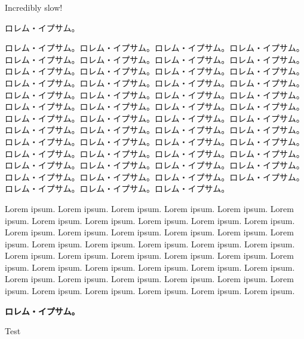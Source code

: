 \documentclass{ltjarticle}
\begin{document}
Incredibly slow!

ロレム・イプサム。

ロレム・イプサム。ロレム・イプサム。ロレム・イプサム。ロレム・イプサム。ロレム・イプサム。ロレム・イプサム。ロレム・イプサム。ロレム・イプサム。ロレム・イプサム。ロレム・イプサム。ロレム・イプサム。ロレム・イプサム。ロレム・イプサム。ロレム・イプサム。ロレム・イプサム。ロレム・イプサム。ロレム・イプサム。ロレム・イプサム。ロレム・イプサム。ロレム・イプサム。ロレム・イプサム。ロレム・イプサム。ロレム・イプサム。ロレム・イプサム。ロレム・イプサム。ロレム・イプサム。ロレム・イプサム。ロレム・イプサム。ロレム・イプサム。ロレム・イプサム。ロレム・イプサム。ロレム・イプサム。ロレム・イプサム。ロレム・イプサム。ロレム・イプサム。ロレム・イプサム。ロレム・イプサム。ロレム・イプサム。ロレム・イプサム。ロレム・イプサム。ロレム・イプサム。ロレム・イプサム。ロレム・イプサム。ロレム・イプサム。ロレム・イプサム。ロレム・イプサム。ロレム・イプサム。ロレム・イプサム。ロレム・イプサム。ロレム・イプサム。ロレム・イプサム。

Lorem ipsum. Lorem ipsum. Lorem ipsum. Lorem ipsum. Lorem ipsum. Lorem ipsum. Lorem ipsum. Lorem ipsum. Lorem ipsum. Lorem ipsum. Lorem ipsum. Lorem ipsum. Lorem ipsum. Lorem ipsum. Lorem ipsum. Lorem ipsum. Lorem ipsum. Lorem ipsum. Lorem ipsum. Lorem ipsum. Lorem ipsum. Lorem ipsum. Lorem ipsum. Lorem ipsum. Lorem ipsum. Lorem ipsum. Lorem ipsum. Lorem ipsum. Lorem ipsum. Lorem ipsum. Lorem ipsum. Lorem ipsum. Lorem ipsum. Lorem ipsum. Lorem ipsum. Lorem ipsum. Lorem ipsum. Lorem ipsum. Lorem ipsum. Lorem ipsum. Lorem ipsum. Lorem ipsum. Lorem ipsum. Lorem ipsum.

\textbf{ロレム・イプサム。}

Test
\end{document}
